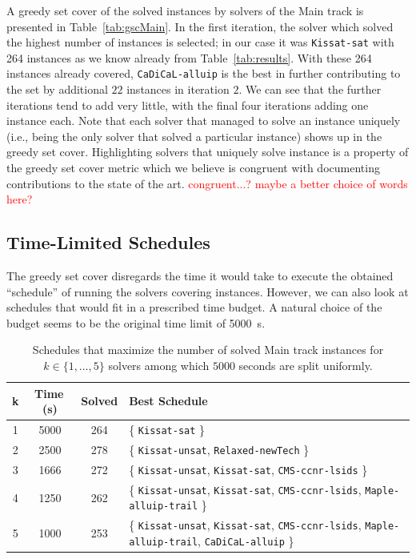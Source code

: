 \documentclass{elsarticle}
\newcommand{\solver}[1]{\texttt{#1}}
\begin{document}
A greedy set cover of the solved instances by solvers of the Main track is presented in Table~\ref{tab:gscMain}. 
In the first iteration, the solver which solved the highest number of instances is selected; in our case it was \solver{Kissat-sat} with 264 instances as we know already from Table~\ref{tab:results}.
With these
 264 instances already covered, \solver{CaDiCaL-alluip} is the best in further contributing to the set by additional $22$ instances in iteration $2$.
We can see that the further iterations tend to add very little,
with the final four iterations adding one instance each. Note that each solver
that managed to solve an instance uniquely (i.e., being the only solver that solved a particular instance)
shows up in the greedy set cover.
Highlighting solvers that uniquely solve instance is a property of the greedy set cover metric
which we believe is congruent with documenting contributions to the state of the art.
\textcolor{red}{congruent...? maybe a better choice of words here?}

\subsection{Time-Limited Schedules}

The greedy set cover 
disregards the time it would take to execute the obtained ``schedule'' of running the solvers covering instances. 
However, we can
also look at schedules that would fit in a prescribed time budget. A natural choice
of the budget seems to be the original time limit of \SI{5000}{\second}.

\begin{table}
\centering\small
\begin{tabulary}{\linewidth}{cccL}
\bf k & \bf Time\,(s) & \bf Solved & \bf Best Schedule \\
 & 5000 & 264 & \{ \solver{Kissat-sat} \}\\
2 & 2500 & 278 & \{ \solver{Kissat-unsat}, \solver{Relaxed-newTech} \}\\
3 & 1666 & 272 & \{ \solver{Kissat-unsat}, \solver{Kissat-sat}, \solver{CMS-ccnr-lsids} \} \\
4 & 1250 & 262 & \{ \solver{Kissat-unsat}, \solver{Kissat-sat}, \solver{CMS-ccnr-lsids}, \phantom{\{ }\solver{Maple-alluip-trail} \}\\ 
5 & 1000 & 253 & \{ \solver{Kissat-unsat}, \solver{Kissat-sat}, \solver{CMS-ccnr-lsids}, \phantom{\{ }\solver{Maple-alluip-trail}, \solver{CaDiCaL-alluip} \}\\
\end{tabulary}
\caption{Schedules that maximize the number of solved Main track instances for $k \in \{1, \dots, 5\}$ solvers among which $5000$ seconds are split uniformly.}
\label{tab:MainUniformTimeSplit}
\end{table}
\end{document}
